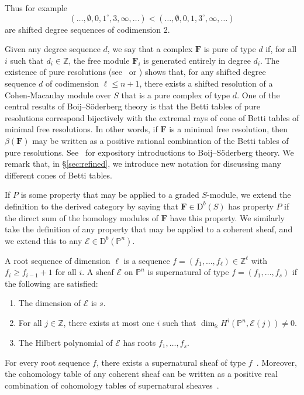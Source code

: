 \documentclass[12pt]{amsart}
\theoremstyle{definition}
\theoremstyle{remark}
\newcommand{\PP}{\mathbb{P}}
\newcommand{\ZZ}{\mathbb{Z}}
\newcommand{\cE}{\mathcal{E}}
\newcommand{\FF}{\mathbf{F}}
\newcommand{\defi}[1]{\textsf{#1}} %
\newcommand{\DD}{\mathrm{D}}
\begin{document}
Thus for example
$$
(\dots, \emptyset , 0, 1^{\circ}, 3, \infty, \dots) < (\dots, \emptyset , 0, 1, 3^{\circ}, \infty, \dots) 
$$
are shifted degree sequences of codimension 2.

Given any degree sequence $d$, we say that a complex $\FF$ is \defi{pure of type $d$} if, for all $i$ such that $d_i\in \ZZ$, the free module $\FF_i$ is generated entirely in degree $d_i$.   The existence of pure resolutions (see~\cite{efw} or \cite[\S5]{eis-schrey1}) shows that, for any shifted degree sequence $d$ of codimension $\ell\leq n+1$, there exists a shifted resolution of a Cohen-Macaulay module over $S$ that is a pure complex of type $d$.  One of the central results of Boij--S\"oderberg theory is that the Betti tables of pure resolutions correspond bijectively with the extremal rays of cone of Betti tables of minimal free resolutions.  In other words, if $\FF$ is a minimal free resolution, then $\beta(\FF)$ may be written as a positive rational combination of the Betti tables of pure resolutions.  See~\cites{eis-schrey-icm,floystad-expository} for expository introductions to Boij--S\"oderberg theory.  We remark that, in \S\ref{sec:refined}, we introduce new notation for discussing many different cones of Betti tables.


If $P$ is some property that may be applied to a graded $S$-module, we extend the definition to the derived category by saying that $\FF \in \DD^b(S)$ has property $P$ if the direct sum of the homology modules of $\FF$ have this property. We similarly take the definition of any property that may be applied to a coherent sheaf, and we extend this to any $\cE\in \DD^b(\PP^n)$.  

A \defi{root sequence of dimension $\ell$} is a sequence $f=(f_1,\dots,f_\ell)\in \mathbb Z^{\ell}$ with $f_i\geq f_{i-1}+1$ for all $i$.  
A sheaf $\cE$ on $\PP^{n}$ is
\defi{supernatural of type} $f=(f_1, \dots, f_{s})$ if the following are satisfied: 
\begin{enumerate}
\item The dimension of $\cE$ is $s$.
\item For all $j\in \mathbb Z$, there exists at most one $i$ 
		such that $\dim_\Bbbk H^i(\PP^{n}, \cE(j))\ne 0$.
\item The Hilbert polynomial of $\cE$ has roots $f_1, \dots, f_{s}$.
\end{enumerate}
For every root sequence $f$, there exists a supernatural sheaf of type
$f$~\cite[Theorem~0.4]{eis-schrey1}.
Moreover, the cohomology table of any coherent sheaf 
can be written as a positive real combination of cohomology tables 
of supernatural sheaves~\cite[Theorem~0.1]{eis-schrey1}.  
\end{document}
